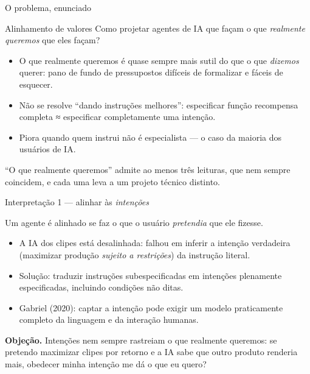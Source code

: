 \documentclass[aspectratio=169, 11pt]{beamer}
\begin{document}
\begin{frame}{O problema, enunciado}
  \begin{defbox}{Alinhamento de valores}
    Como projetar agentes de IA que façam o que \emph{realmente queremos} que
    eles façam?
  \end{defbox}

  {\small
  \begin{itemize}\setlength{\itemsep}{0.25ex}
    \item O que realmente queremos é quase sempre mais sutil do que o que
          \emph{dizemos} querer: pano de fundo de pressupostos difíceis de
          formalizar e fáceis de esquecer.
    \item Não se resolve ``dando instruções melhores'': especificar função
          recompensa completa ≈ especificar completamente uma intenção.
    \item Piora quando quem instrui não é especialista --- o caso da maioria
          dos usuários de IA.
  \end{itemize}}

  \begin{alertabox}
    ``O que realmente queremos'' admite ao menos \alert{três leituras}, que
    nem sempre coincidem, e cada uma leva a um projeto técnico distinto.
  \end{alertabox}
\end{frame}

\begin{frame}{Interpretação 1 --- alinhar às \emph{intenções}}
  \begin{defbox}{}
    Um agente é alinhado se faz o que o usuário \emph{pretendia} que ele
    fizesse.
  \end{defbox}

  {\small
  \begin{itemize}\setlength{\itemsep}{0.25ex}
    \item A IA dos clipes está desalinhada: falhou em inferir a intenção
          verdadeira (maximizar produção \emph{sujeito a restrições}) da
          instrução literal.
    \item Solução: traduzir instruções subespecificadas em intenções
          plenamente especificadas, incluindo condições não ditas.
    \item Gabriel (2020): captar a intenção pode exigir um modelo
          praticamente completo da linguagem e da interação humanas.
  \end{itemize}}

  \vspace{-0.3em}
  \begin{alertabox}
    \textbf{Objeção.} Intenções nem sempre rastreiam o que realmente queremos:
    se pretendo maximizar clipes por retorno e a IA sabe que outro produto
    renderia mais, obedecer minha intenção me dá o que eu quero?
  \end{alertabox}
\end{frame}
\end{document}
